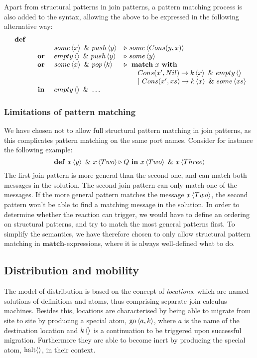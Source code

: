 Apart from structural patterns in join patterns, a pattern matching process is
also added to the syntax, allowing the above to be expressed in the following
alternative way:
\begin{displaymath}
\begin{array}{rcll}
\defJ
\\ & &  \atm some<x> \andJ \atm push<y>&\toJ{} \atm some<Cons(y,x)>
\\ &\orJ&\atm empty<> \andJ \atm push<y> &\toJ{} \atm some<y>
\\ &\orJ&\atm some<x> \andJ \atm pop<k> &\toJ{}  \match x \with
\\ &&& \qquad         Cons(x',Nil) \to \atm k<x> \andJ \atm empty<>
\\ &&& \qquad    |~ Cons(x',xs) \to \atm k<x> \andJ \atm some<xs>
\\&\inJ& \atm empty<> \andJ \ldots
\end{array}
\end{displaymath}

\subsubsection{Limitations of pattern matching}
We have chosen not to allow full structural pattern matching in join patterns,
as this complicates pattern matching on the same port names. Consider for
instance the following example:
\begin{equation*}
 \mathbf{def}~ \atm x<y>~\&~ \atm x<Two> \triangleright Q~
 \mathbf{in}~\atm x<Two>~\&~\atm x<Three>
\end{equation*}
The first join pattern is more general than the second one, and can match both
messages in the solution. The second join pattern can only match one of the
messages. If the more general pattern matches the message $\atm x<Two>$, the
second pattern won't be able to find a matching message in the solution. In
order to determine whether the reaction can trigger, we would have to define an
ordering on structural patterns, and try to match the most general patterns
first. To simplify the semantics, we have therefore chosen to only allow
structural pattern matching in $\mathbf{match}$-expressions, where it is always
well-defined what to do.

\subsection{Distribution and mobility}
The model of distribution is based on the concept of \emph{locations}, which
are named solutions of definitions and atoms, thus comprising separate
join-calculus machines. Besides this, locations are characterised by being able
to migrate from site to site by producing a special atom, $\Go<a,k>$, where $a$
is the name of the destination location and $\atm k <>$ is a continuation to be
triggered upon successful migration. Furthermore they are able to become inert
by producing the special atom, $\Halt<>$, in their context.


